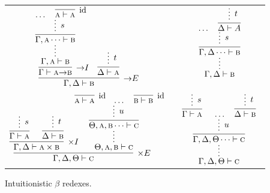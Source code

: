 \begin{figure}
	\centering
	\begin{tabularx}{0.9\textwidth}{@{}c@{~}c@{~}c@{}}
	$\infer[\ii E]{\Gamma, \Delta \vdash \prop{B}}{
	\infer[\ii I]{\Gamma \vdash \prop{A} \ii \prop{B}}{
		\infer*[]{\Gamma, \prop{A} \vdash \prop{B}}{
			\infer[]{\Gamma, \prop{A} \dots \vdash \prop{B}}{
					\infer*[s]{}{\dots & \infer[\Ax]{\prop{A} \vdash \prop{A}}{}}
				}
			}
		}
		&
		\infer{\Delta \vdash \prop{A}}{
			\infer*[t]{}{}
		}
	}$
	&
	\raisebox{20pt}{$\implies$}
	&
	$ 
	\infer*[]{\Gamma, \Delta \vdash \prop{B}}{
		\infer[]{\Gamma, \Delta \dots \vdash \prop{B}}{
			\infer*[s]{}{
			\dots &
			\infer[]{\Delta \vdash A}{
				\infer*[t]{}{}
			}}
		}
	}
	$\\[\smallsep]
	$
	\infer[\times E]{\Gamma, \Delta, \Theta \vdash \prop{C}}{
		\infer[\times I]{\Gamma, \Delta \vdash \prop{A} \times \prop{B}}{
			\infer[]{\Gamma \vdash \prop{A}}{\infer*[s]{}{}}
			&
			\infer[]{\Delta \vdash \prop{B}}{\infer*[t]{}{}}
		}		
		&
		\hspace{-15pt}
		\infer*[]{\Theta, \prop{A}, \prop{B} \vdash \prop{C}}{
			\infer[]{\Theta, \prop{A}, \prop{B}\dots \vdash \prop{C}}{
				\infer*[u]{}{
					\infer[\Ax]{\prop{A} \vdash \prop{A}}{
					}
					&
					\dots
					&
					\infer[\Ax]{\prop{B} \vdash \prop{B}}{}
				}
			}
		}
	}
	$
	&
	\raisebox{20pt}{$\implies$}
	&
	$
	\infer*[]{\Gamma, \Delta, \Theta \vdash \prop{C}}{
		\infer[]{\Gamma, \Delta, \Theta \dots \vdash \prop{C}}{
			\infer*[u]{}{
				\infer[]{\Gamma \vdash \prop{A}}{
					\infer*[s]{}{}
				}
				&
				\dots 
				&
				\infer[]{\Delta \vdash \prop{B}}{
					\infer*[t]{}{}
				}
			}
		}
	} 
	$
	\end{tabularx}	\caption{Intuitionistic $\beta$ redexes.}
	\label{figure:intuitionistic_proof_reduction}
\end{figure}


